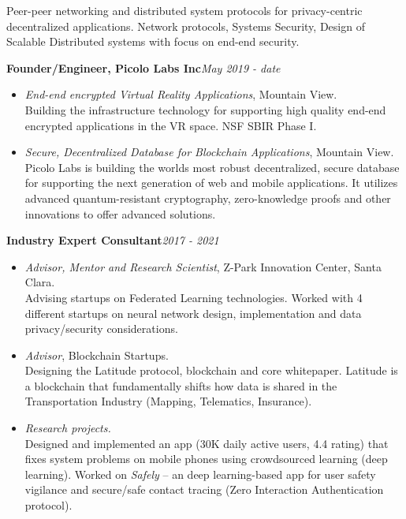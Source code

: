 

\begin{resume}
Peer-peer networking and distributed system protocols for privacy-centric decentralized applications.
Network protocols, Systems Security, Design of Scalable Distributed systems with focus on end-end
security.

    {\bf Founder/Engineer, Picolo Labs Inc}\hfill{\it May 2019 - date}
    \begin{itemize}
        \item [] {\it End-end encrypted Virtual Reality Applications}, Mountain View. \\
              Building the infrastructure technology for supporting high quality end-end encrypted
              applications in the VR space. NSF SBIR Phase I.
        \item [] {\it Secure, Decentralized Database for Blockchain Applications}, Mountain View. \\
              Picolo Labs is building the worlds most robust decentralized, secure database for supporting
              the next generation of web and mobile applications. It utilizes advanced quantum-resistant
              cryptography, zero-knowledge proofs and other innovations to offer advanced solutions.
    \end{itemize}
    {\bf Industry Expert Consultant}\hfill{\it  2017 - 2021 }
    \begin{itemize}
        \item [] {\it Advisor, Mentor and Research Scientist}, Z-Park Innovation Center, Santa Clara. \\
            Advising startups on Federated Learning technologies. Worked with 4 different startups on neural network design,
            implementation and data privacy/security considerations.
        \item [] {\it Advisor}, Blockchain Startups. \\ 
            Designing the Latitude protocol, blockchain and core
            whitepaper. Latitude is a blockchain that fundamentally shifts how data is shared in the Transportation
            Industry (Mapping, Telematics, Insurance).
        \item [] {\it Research projects.} \\
            Designed and implemented an app (30K daily active users, 4.4 rating) that fixes system problems on mobile
            phones using crowdsourced learning (deep learning). Worked on {\em Safely} -- an deep learning-based app for user safety vigilance
            and secure/safe contact tracing (Zero Interaction Authentication protocol).
    \end{itemize}


\end{resume}
